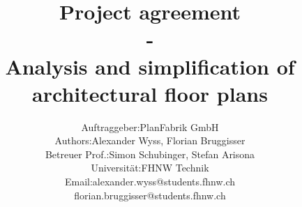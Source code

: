 \documentclass[11pt, a4paper]{report}
\begin{document}
	\title{\textbf{Project agreement \\ - \\Analysis and simplification of architectural floor plans}}
	\author{
			\begin{tabular}{l  l}
				Auftraggeber: & PlanFabrik GmbH \\
				Authors: & Alexander Wyss, Florian Bruggisser \\
				Betreuer Prof.: & Simon Schubinger, Stefan Arisona \\ Universität: & FHNW Technik \\
				Email: & alexander.wyss@students.fhnw.ch \\ & florian.bruggisser@students.fhnw.ch				
			\end{tabular}
	}
	
	\maketitle
	\tableofcontents
	
	
	
	
	
	
\end{document}
